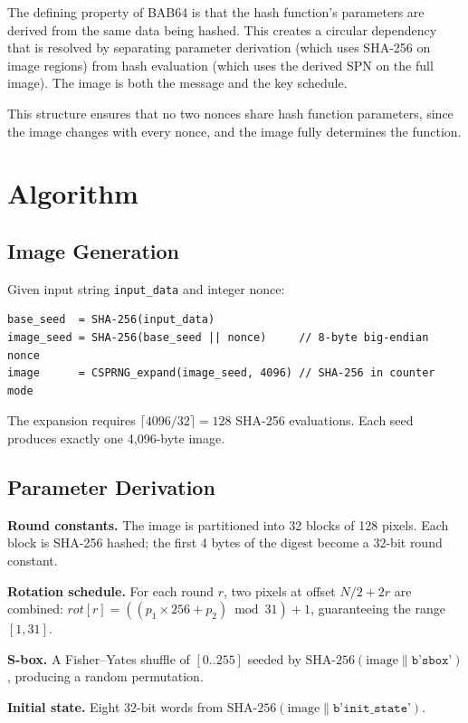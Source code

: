 \documentclass[preprint]{iacrtrans}
\begin{document}
The defining property of BAB64 is that the hash function's parameters are derived from the same data being hashed. This creates a circular dependency that is resolved by separating parameter derivation (which uses SHA-256 on image regions) from hash evaluation (which uses the derived SPN on the full image). The image is both the message and the key schedule.

This structure ensures that no two nonces share hash function parameters, since the image changes with every nonce, and the image fully determines the function.

\section{Algorithm}

\subsection{Image Generation}

Given input string \texttt{input\_data} and integer nonce:

\begin{lstlisting}
base_seed  = SHA-256(input_data)
image_seed = SHA-256(base_seed || nonce)     // 8-byte big-endian nonce
image      = CSPRNG_expand(image_seed, 4096) // SHA-256 in counter mode
\end{lstlisting}

The expansion requires $\lceil 4096 / 32 \rceil = 128$ SHA-256 evaluations. Each seed produces exactly one 4{,}096-byte image.

\subsection{Parameter Derivation}

\textbf{Round constants.} The image is partitioned into 32 blocks of 128 pixels. Each block is SHA-256 hashed; the first 4 bytes of the digest become a 32-bit round constant.

\textbf{Rotation schedule.} For each round $r$, two pixels at offset $N/2 + 2r$ are combined: $\mathit{rot}[r] = ((p_1 \times 256 + p_2) \bmod 31) + 1$, guaranteeing the range $[1, 31]$.

\textbf{S-box.} A Fisher--Yates shuffle of $[0..255]$ seeded by $\text{SHA-256}(\text{image} \| \texttt{b'sbox'})$, producing a random permutation.

\textbf{Initial state.} Eight 32-bit words from $\text{SHA-256}(\text{image} \| \texttt{b'init\_state'})$.
\end{document}
